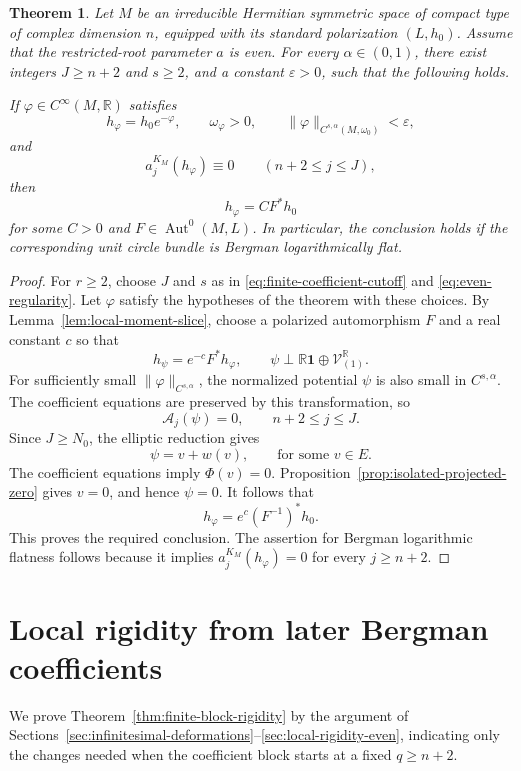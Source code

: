 \documentclass[11pt,reqno]{amsart}
\newtheorem{theorem}{Theorem}[section]
\theoremstyle{corollary}
\theoremstyle{conjecture}
\theoremstyle{assumption}
\theoremstyle{proposition}
\theoremstyle{remark}
\numberwithin{equation}{section}
\begin{document}
\begin{theorem}\label{thm:even-a-rigidity}
Let $M$ be an irreducible Hermitian symmetric space of compact type of complex dimension $n$, equipped with its standard polarization $(L,h_0)$. Assume that the restricted-root parameter $a$ is even. For every $\alpha\in(0,1)$, there exist integers $J\geq n+2$ and $s\geq 2$, and a constant $\varepsilon>0$, such that the following holds.

If $\varphi\in C^\infty(M,\mathbb R)$ satisfies
\[
h_\varphi=h_0e^{-\varphi},\qquad\omega_\varphi>0,\qquad\|\varphi\|_{C^{s,\alpha}(M,\omega_0)}<\varepsilon,
\]
and
\[
a^{K_M}_j(h_\varphi)\equiv0\qquad(n+2\leq j\leq J),
\]
then
\[
h_\varphi=CF^*h_0
\]
for some $C>0$ and $F\in\operatorname{Aut}^0(M,L)$. In particular, the conclusion holds if the corresponding unit circle bundle is Bergman logarithmically flat.
\end{theorem}
\begin{proof}
For $r\geq 2$, choose $J$ and $s$ as in \eqref{eq:finite-coefficient-cutoff} and \eqref{eq:even-regularity}. Let $\varphi$ satisfy the hypotheses of the theorem with these choices. By Lemma~\ref{lem:local-moment-slice}, choose a polarized
automorphism $F$ and a real constant $c$ so that
\[
h_\psi=e^{-c}F^*h_\varphi,\qquad \psi\perp\mathbb R\mathbf1\oplus\mathcal V_{(1)}^{\mathbb R}.
\]
For sufficiently small $\|\varphi\|_{C^{s,\alpha}}$, the normalized potential $\psi$ is also small in $C^{s,\alpha}$. The coefficient equations are preserved by this transformation,
so
\[
\mathcal A_j(\psi)=0,\qquad n+2\leq j\leq J.
\]
Since $J\geq N_0$, the elliptic reduction gives
\[
\psi=v+w(v),\qquad \text{for some }v\in E.
\]
The coefficient equations imply $\Phi(v)=0$. Proposition~\ref{prop:isolated-projected-zero} gives $v=0$, and hence $\psi=0$. It follows that
\[
h_\varphi=e^c(F^{-1})^*h_0.
\]
This proves the required conclusion. The assertion for Bergman logarithmic flatness follows because it implies $a^{K_M}_j(h_\varphi)=0$ for every $j\geq n+2$.
\end{proof}


\section{Local rigidity from later Bergman coefficients}
\label{sec:later-bergman-coefficients}

We prove Theorem~\ref{thm:finite-block-rigidity} by the argument of Sections~\ref{sec:infinitesimal-deformations}--\ref{sec:local-rigidity-even}, indicating only the changes needed when the coefficient block starts at a fixed $q\geq n+2$.
\end{document}
